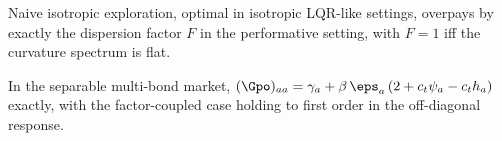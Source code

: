 \documentclass[11pt]{article}
\begin{document}
\begin{proposition}
Naive isotropic exploration, optimal in isotropic LQR-like settings,
overpays by exactly the dispersion factor $F$ in the performative
setting, with $F = 1$ iff the curvature spectrum is flat.
\end{proposition}

\begin{proposition}
In the separable multi-bond market,
$(\Gpo)_{aa} = \gamma_a + \beta\,\eps_a\,(2 + c_t\psi_a - c_t h_a)$
exactly, with the factor-coupled case holding to first order in the
off-diagonal response.
\end{proposition}

\end{document}
